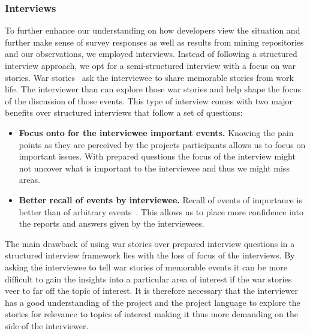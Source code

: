 \subsubsection{Interviews}
To further enhance our understanding on how developers view the situation and further make sense of survey responses as well as results from mining repositories and our observations, we employed interviews.
Instead of following a structured interview approach, we opt for a semi-structured interview with a focus on war stories.
War stories~\cite{lutters:ist:2007} ask the interviewee to share memorable stories from work life.
The interviewer than can explore those war stories and help shape the focus of the discussion of those events.
This type of interview comes with two major benefits over structured interviews that follow a set of questions:

\begin{itemize}
\item\textbf{Focus onto for the interviewee important events.}
Knowing the pain points as they are perceived by the projects participants allows us to focus on important issues.
With prepared questions the focus of the interview might not uncover what is important to the interviewee and thus we might miss areas.
\item\textbf{Better recall of events by interviewee.}
Recall of events of importance is better than of arbitrary events~\cite{lutters:ist:2007}.
This allows us to place more confidence into the reports and answers given by the interviewees.
\end{itemize}

The main drawback of using war stories over prepared interview questions in a structured interview framework lies with the loss of focus of the interviews.
By asking the interviewee to tell war stories of memorable events it can be more difficult to gain the insights into a particular area of interest if the war stories veer to far off the topic of interest.
It is therefore necessary that the interviewer has a good understanding of the project and the project language to explore the stories for relevance to topics of interest making it thus more demanding on the side of the interviewer.











